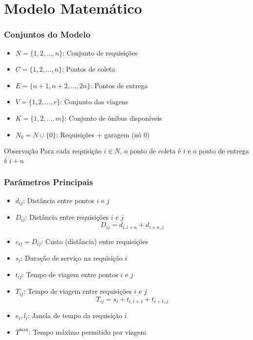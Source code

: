 \documentclass[10pt]{beamer}
\begin{document}
\section{Modelo Matemático}

\begin{frame}
\frametitle{Conjuntos do Modelo}
\begin{itemize}
    \item $N = \{1, 2, \dots, n\}$: Conjunto de requisições
    \item $C = \{1, 2, \dots, n\}$: Pontos de coleta
    \item $E = \{n+1, n+2, \dots, 2n\}$: Pontos de entrega
    \item $V = \{1, 2, \dots, r\}$: Conjunto das viagens
    \item $K = \{1, 2, \dots, m\}$: Conjunto de ônibus disponíveis
    \item $N_0 = N \cup \{0\}$: Requisições + garagem (nó 0)
\end{itemize}

\vspace{0.5cm}
\begin{alertblock}{Observação}
Para cada requisição $i \in N$, o ponto de coleta é $i$ e o ponto de entrega é $i+n$
\end{alertblock}
\end{frame}

\begin{frame}
\frametitle{Parâmetros Principais}
\begin{itemize}
    \item $d_{ij}$: Distância entre pontos $i$ e $j$
    \item $D_{ij}$: Distância entre requisições $i$ e $j$
    \begin{equation*}
    D_{ij} = d_{i, i+n} + d_{i+n, j}
    \end{equation*}
    \item $c_{ij} = D_{ij}$: Custo (distância) entre requisições
    \item $s_i$: Duração de serviço na requisição $i$
    \item $t_{ij}$: Tempo de viagem entre pontos $i$ e $j$
    \item $T_{ij}$: Tempo de viagem entre requisições $i$ e $j$
    \begin{equation*}
        T_{ij} =  s_i + t_{i,i+1} + t_{i+1,j}
    \end{equation*}
    \item $e_i, l_i$: Janela de tempo da requisição $i$
    \item $T^{\max}$: Tempo máximo permitido por viagem
\end{itemize}
\end{frame}
\end{document}
